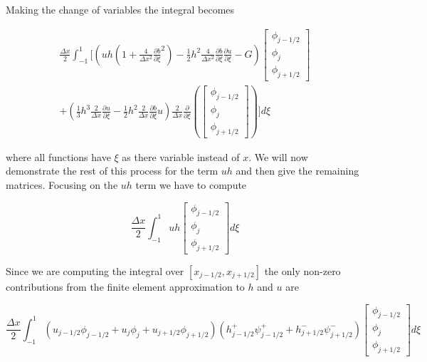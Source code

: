 Making the change of variables the integral becomes

\begin{multline}
\frac{\Delta x}{2}\int_{-1 }^{1} \Bigg[  \left( uh \left(1 + \frac{4}{\Delta x^2}\frac{\partial b}{\partial \xi}^2 \right)  - \frac{1}{2}h^2  \frac{4}{\Delta x^2} \frac{\partial b}{\partial \xi}  \frac{\partial u }{\partial \xi}  -  G \right) \begin{bmatrix}
\phi_{j-1/2}\\\phi_j \\\phi_{j+1/2}
\end{bmatrix}   \\ +  \left( \frac{1}{3}h^3 \frac{2}{\Delta x}\frac{\partial {u}}{\partial \xi}    -     \frac{1}{2}h^2 \frac{2}{\Delta x}\frac{\partial b}{\partial \xi} u    \right)  \frac{2}{\Delta x}\frac{\partial}{\partial \xi}\left(\begin{bmatrix}
\phi_{j-1/2}\\\phi_j \\\phi_{j+1/2}
\end{bmatrix} \right) \Bigg]d\xi
\end{multline}

where all functions have $\xi$ as there variable instead of $x$. We will now demonstrate the rest of this process for the term $uh$ and then give the remaining matrices. Focusing on the $uh$ term we have to compute  

\begin{equation}
\frac{\Delta x}{2}\int_{-1 }^{1}  uh \begin{bmatrix}
\phi_{j-1/2}\\\phi_j \\\phi_{j+1/2}
\end{bmatrix} d\xi
\end{equation}

Since we are computing the integral over $\left[x_{j-1/2},x_{j+1/2}\right]$ the only non-zero contributions from the finite element approximation to $h$ and $u$ are


\begin{equation}
\frac{\Delta x}{2}\int_{-1 }^{1}  \left(u_{j-1/2}\phi_{j-1/2} + u_{j}\phi_{j} + u_{j+1/2}\phi_{j+1/2}\right) \left(h^+_{j-1/2}\psi^+_{j-1/2}  + h^-_{j+1/2}\psi^-_{j+1/2}\right) \begin{bmatrix}
\phi_{j-1/2}\\\phi_j \\\phi_{j+1/2}
\end{bmatrix} d\xi
\end{equation}

